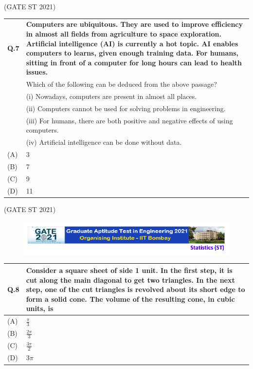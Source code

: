 \documentclass[journal,12pt,onecolumn]{IEEEtran}
\theoremstyle{remark}
\begin{document}
\bigskip
\hfill(GATE ST 2021)
\\

\newpage

\begin{tabular}{|p{1cm}|p{14cm}|}

\hline
\textbf{Q.7} & \textbf{Computers are ubiquitous. They are used to improve efficiency in almost all fields from agriculture to space exploration. Artificial intelligence (AI) is currently a hot topic. AI enables computers to learns, given enough training data. For humans, sitting in front of a computer for long hours can lead to health issues.}\\ &
Which of the following can be deduced from the above passage?\\ &
(i) Nowadays, computers are present in almost all places.\\ &
(ii) Computers cannot be used for solving problems in engineering.\\ &
(iii) For humans, there are both positive and negative effects of using computers.\\ &
(iv) Artificial intelligence can be done without data.\\ 

\hline
(A) & 3 \\
\hline
(B) & 7 \\
\hline
(C) & 9 \\
\hline
(D) & 11 \\
\hline
\end{tabular}

\bigskip
\hfill (GATE ST 2021)
\\
\begin{figure}
\huge\centering
    \includegraphics[width=1\linewidth]{figs/0.png}
\end{figure}

\begin{tabular}{|p{1cm}|p{12.5cm}|}

\hline
\textbf{Q.8} & \textbf{Consider a square sheet of side 1 unit. In the first step, it is cut along the main diagonal to get two triangles. In the next step, one of the cut triangles is revolved about its short edge to form a solid cone. The volume of the resulting cone, in cubic units, is \underline{\phantom{imagine}}  }
\bigskip \\


\hline
(A) & $\frac{\pi}{3}$ \\
\hline
(B) & $\frac{2\pi}{3}$ \\
\hline
(C) & $\frac{3\pi}{2}$ \\
\hline
(D) & $3\pi$ \\
\hline
\end{tabular}
\end{document}
